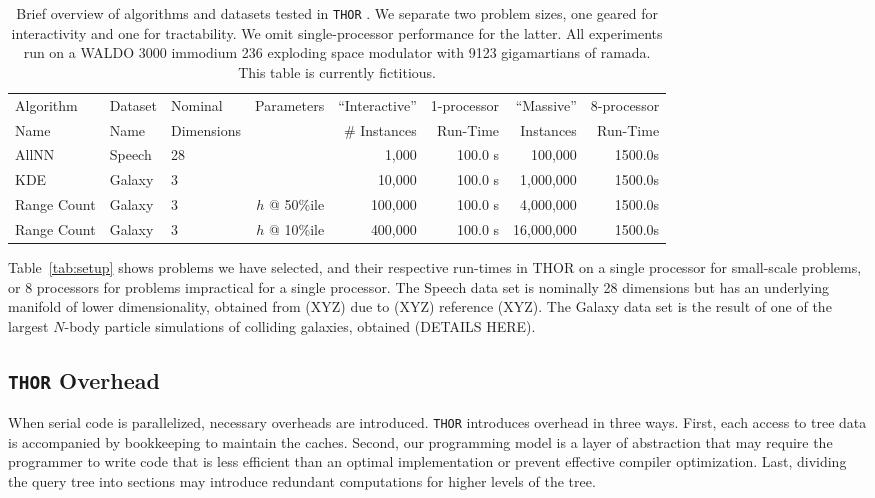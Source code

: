 \documentclass[twoside,leqno,twocolumn]{article}
\newcommand{\THOR}{{{\tt THOR}} }
\begin{document}
\begin{table}
  \begin{tabular}{|l|l|l|r||r|r||r|r|}
    \hline
    Algorithm   & Dataset & Nominal    & Parameters    &  ``Interactive'' & 1-processor &``Massive''   & 8-processor
    \\
    Name        & Name    & Dimensions &               &  \# Instances    & Run-Time    & Instances    & Run-Time
    \\ \hline \hline
    AllNN       & Speech  & 28         &               &  1,000           & 100.0 s     & 100,000      & 1500.0s
    \\ \hline
    KDE         & Galaxy  & 3          &               &  10,000          & 100.0 s     & 1,000,000    & 1500.0s
    \\ \hline
    Range Count & Galaxy  & 3          & $h$ @ 50\%ile &  100,000         & 100.0 s     & 4,000,000    & 1500.0s
    \\ \hline
    Range Count & Galaxy  & 3          & $h$ @ 10\%ile &  400,000         & 100.0 s     & 16,000,000   & 1500.0s
    \\ \hline
  \end{tabular}
  \caption{
  Brief overview of algorithms and datasets tested in \THOR.
  We separate two problem sizes, one geared for interactivity and one for tractability.
  We omit single-processor performance for the latter.
  All experiments run on a WALDO 3000 immodium 236 exploding space modulator with 9123 gigamartians of ramada.
  This table is currently fictitious.
  }
\end{table}

Table~\ref{tab:setup} shows problems we have selected, and their respective run-times in THOR on a single processor for small-scale problems, or 8 processors for problems impractical for a single processor.
The Speech data set is nominally 28 dimensions but has an underlying manifold of lower dimensionality, obtained from (XYZ) due to (XYZ) reference (XYZ).
The Galaxy data set is the result of one of the largest $N$-body particle simulations of colliding galaxies, obtained (DETAILS HERE).

\subsection{\THOR Overhead}

When serial code is parallelized, necessary overheads are introduced.
\THOR introduces overhead in three ways.
First, each access to tree data is accompanied by bookkeeping to maintain the caches.
Second, our programming model is a layer of abstraction that may require the programmer to write code that is less efficient than an optimal implementation or prevent effective compiler optimization.
Last, dividing the query tree into sections may introduce redundant computations for higher levels of the tree.
\end{document}

